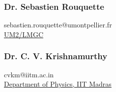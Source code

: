\documentclass{my_cv}%
\begin{document}
\begin{minipage}{0.5\textwidth}
\subsubsection{Dr. Sebastien Rouquette} 
\faAt \hspace{0.2em} sebastien.rouquette@umontpellier.fr\\ \faInstitution \hspace{0.2em} \href{http://www.lmgc.univ-montp2.fr/spip.php?page=pageperso&nom=ROUQUETTE&prenom=S%C3%A9bastien&lang=fr}{UM2/LMGC}
\vspace{1.2em}
\subsubsection{Dr. C. V. Krishnamurthy} 
\faAt \hspace{0.2em} cvkm@iitm.ac.in \\
\faInstitution \hspace{0.2em} \href{http://iitm.irins.org/profile/61936}{Department of Physics, IIT Madras}  
\end{minipage}
\end{document}
